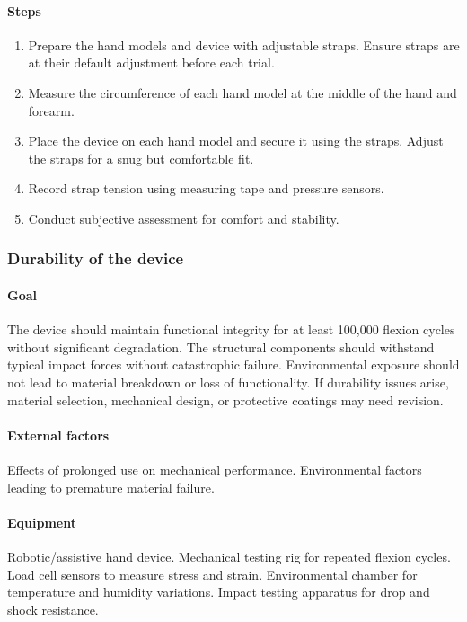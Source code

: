 \documentclass{article}
\begin{document}
\paragraph{Steps}
\begin{enumerate}
    \item Prepare the hand models and device with adjustable straps. Ensure straps are at their default adjustment before each trial.
    \item Measure the circumference of each hand model at the middle of the hand and forearm.
    \item Place the device on each hand model and secure it using the straps. Adjust the straps for a snug but comfortable fit.
    \item Record strap tension using measuring tape and pressure sensors.
    \item Conduct subjective assessment for comfort and stability.
\end{enumerate}

\subsubsection{Durability of the device}

\paragraph{Goal} The device should maintain functional integrity for at least 100,000 flexion cycles without significant degradation. The structural components should withstand typical impact forces without catastrophic failure. Environmental exposure should not lead to material breakdown or loss of functionality. If durability issues arise, material selection, mechanical design, or protective coatings may need revision.

\paragraph{External factors} Effects of prolonged use on mechanical performance. Environmental factors leading to premature material failure.

\paragraph{Equipment} Robotic/assistive hand device. Mechanical testing rig for repeated flexion cycles. Load cell sensors to measure stress and strain. Environmental chamber for temperature and humidity variations. Impact testing apparatus for drop and shock resistance.
\end{document}

